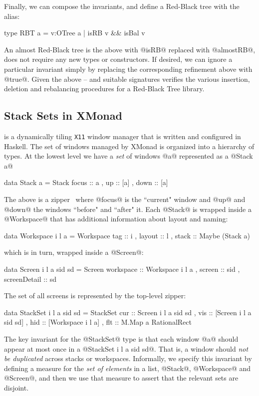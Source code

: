 Finally, we can compose the invariants, and define a 
Red-Black tree with the alias:
%
\begin{code}
  type RBT a = {v:OTree a | isRB v && isBal v}
\end{code}
%
An almost Red-Black tree is the above with @isRB@ 
replaced with @almostRB@, \ie does not require any 
new types or constructors.
If desired, we can ignore a particular invariant 
simply by replacing the corresponding refinement 
above with @true@.
Given the above -- and suitable signatures \toolname 
verifies the various insertion, deletion and rebalancing
procedures for a Red-Black Tree library.

\subsection{Stack Sets in XMonad}\label{sec:xmonad}

\lbxmonad is a dynamically tiling \texttt{X11} 
window manager that is written and configured in Haskell. 
The set of windows managed by XMonad is organized into a
hierarchy of types. At the lowest level we have a 
\emph{set} of windows @a@ represented as a @Stack a@
%
\begin{code}
  data Stack a = Stack { focus :: a   
                       , up    :: [a] 
                       , down  :: [a] }
\end{code}
%
The above is a zipper~\cite{zipper} where @focus@ is the 
``current" window and @up@ and @down@ the windows ``before"
and ``after" it.
%
Each \hbox{@Stack@} is wrapped inside a @Workspace@ that has
additional information about layout and naming:
%
\begin{code}
  data Workspace i l a = Workspace 
     { tag    :: i
     , layout :: l
     , stack  :: Maybe (Stack a) }
\end{code}
%
which is in turn, wrapped inside a @Screen@:
%
\begin{code}
  data Screen i l a sid sd = Screen 
    { workspace    :: Workspace i l a
    , screen       :: sid
    , screenDetail :: sd }
\end{code}
%
The set of all screens is represented by the top-level zipper:
%
\begin{code}
  data StackSet i l a sid sd = StackSet 
    { cur :: Screen i l a sid sd  
    , vis :: [Screen i l a sid sd]
    , hid :: [Workspace i l a]   
    , flt :: M.Map a RationalRect } 
\end{code}


The key invariant for the @StackSet@ type is that each window @a@
should appear at most once in a @StackSet i l a sid sd@. That is,
a window should \emph{not be duplicated} across stacks or workspaces.
Informally, we specify this invariant by defining a measure for the 
\emph{set of elements} in a list, @Stack@, @Workspace@ and @Screen@,
and then we use that measure to assert that the relevant sets are 
disjoint.

